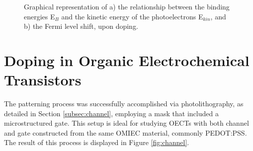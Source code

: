 \begin{figure}[ht]
	\centering
	\hspace{2em}
	\caption[Representation of the Fermi level shift upon doping]{ Graphical representation of a) the relationship between the binding energies E$_{B}$ and the kinetic energy of the photoelectrons E$_{kin}$, and b) the Fermi level shift, upon doping.} 
	\label{fig:ups}
\end{figure}


\section{Doping in Organic Electrochemical Transistors}
The patterning process was successfully accomplished via photolithography, as detailed in Section \ref{subsec:channel}, employing a mask that included a microstructured gate. This setup is ideal for studying OECTs with both channel and gate constructed from the same OMIEC material, commonly PEDOT:PSS. The result of this process is displayed in Figure \ref{fig:channel}. 

